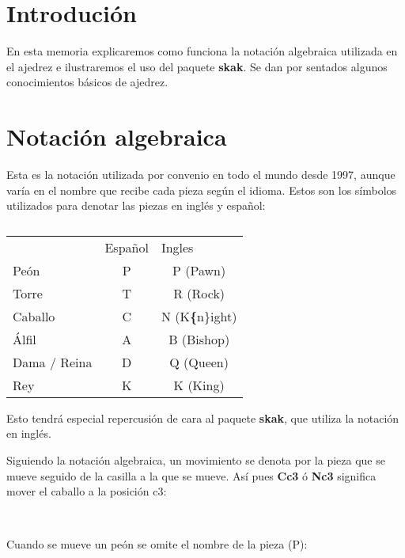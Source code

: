 \documentclass{article}
\begin{document}
\section{Introdución}

En esta memoria explicaremos como funciona la notación algebraica utilizada en el ajedrez e ilustraremos el uso del paquete \textbf{skak}. Se dan por sentados algunos conocimientos básicos de ajedrez.

\section{Notación algebraica}

Esta es la notación utilizada por convenio en todo el mundo desde 1997, aunque varía en el nombre que recibe cada pieza según el idioma. Estos son los símbolos utilizados para denotar las piezas en inglés y español:

\begin{table}[h]
	\centering
	\caption{}
	\label{my-label}
	\begin{tabular}{lcc}
		\textbf{}    & \multicolumn{1}{l}{Español} & \multicolumn{1}{l}{Ingles} \\
		Peón         & P                           & P (Pawn)                   \\
		Torre        & T                           & R (Rock)                   \\
		Caballo      & C                           & N (K\textbf\{n\}ight)      \\
		Álfil        & A                           & B (Bishop)                 \\
		Dama / Reina & D                           & Q (Queen)                  \\
		Rey          & K                           & K (King)                  
	\end{tabular}
\end{table}

Esto tendrá especial repercusión de cara al paquete \textbf{skak}, que utiliza la notación en inglés.

Siguiendo la notación algebraica, un movimiento se denota por la pieza que se mueve seguido de la casilla a la que se mueve. Así pues \textbf{Cc3} ó \textbf{Nc3} significa mover el caballo a la posición c3:

\newgame
{} \\
\showboard

Cuando se mueve un peón se omite el nombre de la pieza (P):
\end{document}
